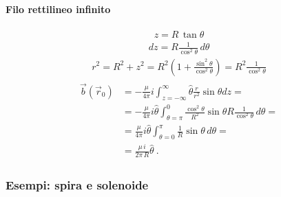 \documentclass[letterpaper,10pt,italian]{jupyterBook}
\begin{document}
\paragraph{Filo rettilineo infinito}
\label{\detokenize{ch/electromagnetism/electromagnetism-steady:filo-rettilineo-infinito}}\begin{equation*}
\begin{split}z = R \, \tan \theta\end{split}
\end{equation*}\begin{equation*}
\begin{split}dz = R \frac{1}{\cos^2 \theta} \, d \theta\end{split}
\end{equation*}\begin{equation*}
\begin{split}r^2 = R^2 + z^2 = R^2 \left(1+\frac{\sin^2 \theta}{\cos^2 \theta} \right) = R^2 \frac{1}{\cos^2 \theta}\end{split}
\end{equation*}\begin{equation*}
\begin{split}\begin{aligned}
  \vec{b}(\vec{r}_0) & = - \frac{\mu}{4 \pi} i \int_{z=-\infty}^{\infty} \hat{\theta} \frac{r}{r^2} \sin \theta dz = \\
                     & = - \frac{\mu}{4 \pi} i \hat{\theta} \int_{\theta=\pi}^{0} \frac{\cos^2 \theta}{R^2} \sin \theta R \frac{1}{\cos^2 \theta} \, d \theta = \\
                     & =   \frac{\mu}{4 \pi} i \hat{\theta} \int_{\theta=0}^{\pi} \frac{1}{R} \sin \theta \, d \theta = \\
                     & =   \frac{\mu \, i}{2 \pi \, R} \hat{\theta} \ .
\end{aligned}\end{split}
\end{equation*}

\subsubsection{Esempi: spira e solenoide}
\label{\detokenize{ch/electromagnetism/electromagnetism-steady:esempi-spira-e-solenoide}}
\end{document}

